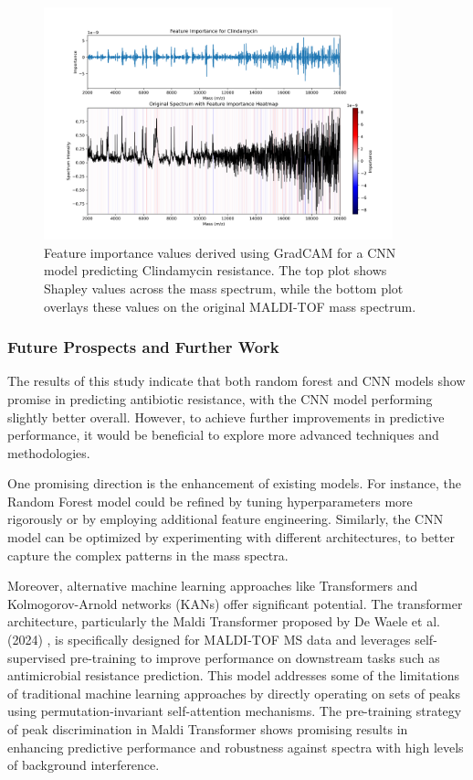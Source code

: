 \documentclass[english,11pt,a4paper,titlepage]{article}
\begin{document}
\begin{figure}[h]
	\centering
	\includegraphics[width=0.9\textwidth]{img/Clindamycin_gradcam.png}
	\caption{Feature importance values derived using GradCAM for a CNN model predicting Clindamycin resistance. The top plot shows Shapley values across the mass spectrum, while the bottom plot overlays these values on the original MALDI-TOF mass spectrum.}
	\label{fig:clindamycin_gradcam}
\end{figure}

\subsubsection*{Future Prospects and Further Work}
The results of this study indicate that both random forest and CNN models show promise in predicting antibiotic resistance, with the CNN model performing slightly better overall. However, to achieve further improvements in predictive performance, it would be beneficial to explore more advanced techniques and methodologies.

One promising direction is the enhancement of existing models. For instance, the Random Forest model could be refined by tuning hyperparameters more rigorously or by employing additional feature engineering. Similarly, the CNN model can be optimized by experimenting with different architectures, to better capture the complex patterns in the mass spectra.

Moreover, alternative machine learning approaches like Transformers and Kolmogorov-Arnold networks (KANs) offer significant potential. The transformer architecture, particularly the Maldi Transformer proposed by De Waele et al. (2024) \cite{dewaelePretrainedMaldiTransformers2024}, is specifically designed for MALDI-TOF MS data and leverages self-supervised pre-training to improve performance on downstream tasks such as antimicrobial resistance prediction. This model addresses some of the limitations of traditional machine learning approaches by directly operating on sets of peaks using permutation-invariant self-attention mechanisms. The pre-training strategy of peak discrimination in Maldi Transformer shows promising results in enhancing predictive performance and robustness against spectra with high levels of background interference.
\end{document}
